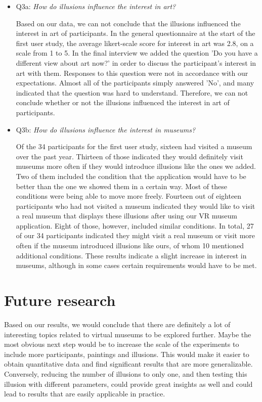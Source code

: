 \documentclass[a4paper]{article}
\begin{document}
\begin{itemize}
\item Q3a: \emph{How do illusions influence the interest in art?}

Based on our data, we can not conclude that the illusions influenced the interest in art of participants. In the general questionnaire at the start of the first user study, the average likert-scale score for interest in art was 2.8, on a scale from 1 to 5. In the final interview we added the question 'Do you have a different view about art now?' in order to discuss the participant's interest in art with them. Responses to this question were not in accordance with our expectations. Almost all of the participants simply answered 'No', and many indicated that the question was hard to understand. Therefore, we can not conclude whether or not the illusions influenced the interest in art of participants.

\item Q3b: \emph{How do illusions influence the interest in museums?}

Of the 34 participants for the first user study, sixteen had visited a museum over the past year. Thirteen of those indicated they would definitely visit museums more often if they would introduce illusions like the ones we added. Two of them included the condition that the application would have to be better than the one we showed them in a certain way. Most of these conditions were being able to move more freely. Fourteen out of eighteen participants who had not visited a museum indicated they would like to visit a real museum that displays these illusions after using our VR museum application. Eight of those, however, included similar conditions. In total, 27 of our 34 participants indicated they might visit a real museum or visit more often if the museum introduced illusions like ours, of whom 10 mentioned additional conditions. These results indicate a slight increase in interest in museums, although in some cases certain requirements would have to be met.

\end{itemize}


\section{Future research}

Based on our results, we would conclude that there are definitely a lot of interesting topics related to virtual museums to be explored further. Maybe the most obvious next step would be to increase the scale of the experiments to include more participants, paintings and illusions. This would make it easier to obtain quantitative data and find significant results that are more generalizable. Conversely, reducing the number of illusions to only one, and then testing this illusion with different parameters, could provide great insights as well and could lead to results that are easily applicable in practice.
\end{document}
